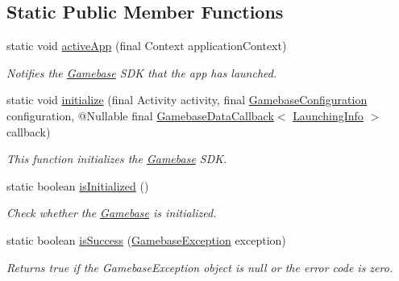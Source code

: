 \subsection*{Static Public Member Functions}
\begin{DoxyCompactItemize}
\item 
static void \hyperlink{classcom_1_1toast_1_1android_1_1gamebase_1_1_gamebase_a07fe4c62c585e8af9f924935e813ff12}{active\+App} (final Context application\+Context)
\begin{DoxyCompactList}\small\item\em Notifies the \hyperlink{classcom_1_1toast_1_1android_1_1gamebase_1_1_gamebase}{Gamebase} S\+DK that the app has launched. \end{DoxyCompactList}\item 
static void \hyperlink{classcom_1_1toast_1_1android_1_1gamebase_1_1_gamebase_a1b2d26183c219ab1ef840a95af71bd88}{initialize} (final Activity activity, final \hyperlink{classcom_1_1toast_1_1android_1_1gamebase_1_1_gamebase_configuration}{Gamebase\+Configuration} configuration, @Nullable final \hyperlink{interfacecom_1_1toast_1_1android_1_1gamebase_1_1_gamebase_data_callback}{Gamebase\+Data\+Callback}$<$ \hyperlink{classcom_1_1toast_1_1android_1_1gamebase_1_1launching_1_1data_1_1_launching_info}{Launching\+Info} $>$ callback)
\begin{DoxyCompactList}\small\item\em This function initializes the \hyperlink{classcom_1_1toast_1_1android_1_1gamebase_1_1_gamebase}{Gamebase} S\+DK. \end{DoxyCompactList}\item 
static boolean \hyperlink{classcom_1_1toast_1_1android_1_1gamebase_1_1_gamebase_a40e7b7b4c19a8bf4140aa22033ab6489}{is\+Initialized} ()
\begin{DoxyCompactList}\small\item\em Check whether the \hyperlink{classcom_1_1toast_1_1android_1_1gamebase_1_1_gamebase}{Gamebase} is initialized. \end{DoxyCompactList}\item 
static boolean \hyperlink{classcom_1_1toast_1_1android_1_1gamebase_1_1_gamebase_adec8e86d913bbdb88df6244f7aec6f2a}{is\+Success} (\hyperlink{classcom_1_1toast_1_1android_1_1gamebase_1_1base_1_1_gamebase_exception}{Gamebase\+Exception} exception)
\begin{DoxyCompactList}\small\item\em Returns true if the Gamebase\+Exception object is null or the error code is zero. \end{DoxyCompactList}\item 

\end{DoxyCompactItemize}
